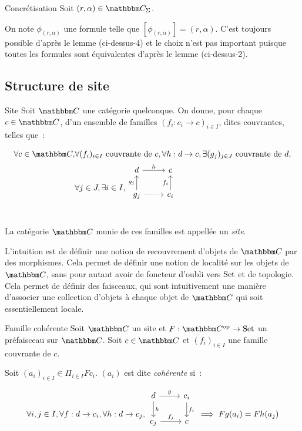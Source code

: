 \begin{defi}{Concrétisation}
    Soit $(r,\alpha)\in\C_\Sigma$.

    On note $\phi_{(r,\alpha)}$ une formule telle que $[\phi_{(r,\alpha)}] = (r,\alpha)$.
    C'est toujours possible d'après le lemme (ci-dessus-4) et le choix n'est pas important
    puisque toutes les formules sont équivalentes d'après le lemme (ci-dessus-2).
\end{defi}

\subsection{Structure de site}

\begin{defi}{Site}
    Soit $\C$ une catégorie quelconque. On donne, pour
    chaque $c\in\C$, d'un ensemble de familles $(f_i : c_i\rightarrow c)_{i\in I}$,
    dites couvrantes, telles que~:

    \begin{align*}
        \forall c\in\C, & \forall (f_i)_{i\in I} \text{ couvrante de } c,
          \forall h : d\rightarrow c, \exists (g_j)_{j\in J} \text{ couvrante de } d, \\
        & \forall j\in J, \exists i\in I,
          \begin{tikzcd}[ampersand replacement=\&]
            d \arrow[r, "h"] \& c \\
            g_j \arrow[u, "g_j"] \arrow[r, dotted] \& c_i \arrow[u, "f_i"] \\
          \end{tikzcd}
    \end{align*}

    La catégorie $\C$ munie de ces familles est appellée un \emph{site}.
\end{defi}

L'intuition est de définir une notion de recouvrement d'objets de $\C$ par des morphismes.
Cela permet de définir une notion de localité sur les objets de $\C$, sans pour autant
avoir de foncteur d'oubli vers $\text{Set}$ et de topologie. Cela permet de définir des
faisceaux, qui sont intuitivement une manière d'associer une collection d'objets à
chaque objet de $\C$ qui soit essentiellement locale.

\begin{defi}{Famille cohérente}
    Soit $\C$ un site et $F : \C^{\text{op}}\rightarrow\Set$ un préfaisceau sur
    $\C$. Soit $c\in\C$ et $(f_i)_{i\in I}$ une famille couvrante de $c$.
    
    Soit $(a_i)_{i\in I}\in \Pi_{i\in I} Fc_i$. $(a_i)$ est dite \emph{cohérente} si~:

    \[\forall i,j\in I, \forall f : d\rightarrow c_i, \forall h : d\rightarrow c_j,
      \begin{tikzcd}
          d \arrow[r, "g"] \arrow[d, "h"] & c_i \arrow[d, "f_i"] \\
          c_j \arrow[r, "f_j"] & c \\
      \end{tikzcd}
      \implies Fg(a_i) = Fh(a_j) \]
\end{defi}

